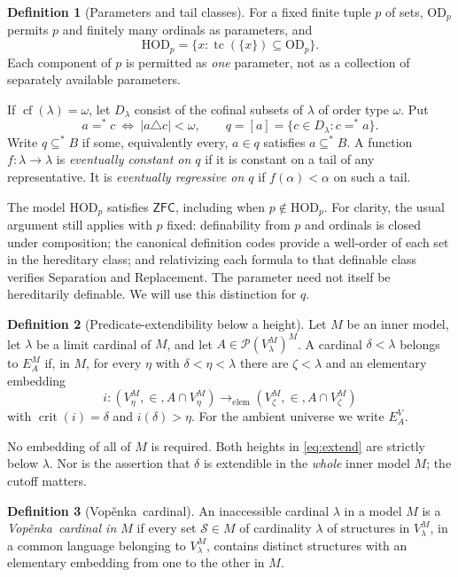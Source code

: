 \documentclass[11pt,letterpaper]{article}
\theoremstyle{definition}
\newtheorem{definition}{Definition}[section]
\numberwithin{equation}{section}
\newcommand{\ZFC}{\mathsf{ZFC}}
\newcommand{\HOD}{\mathrm{HOD}}
\newcommand{\OD}{\mathrm{OD}}
\newcommand{\crit}{\operatorname{crit}}
\newcommand{\cf}{\operatorname{cf}}
\newcommand{\Pow}{\mathcal P}
\newcommand{\tc}{\operatorname{tc}}
\newcommand{\Vop}{Vop\v{e}nka}
\newcommand{\prelem}{\longrightarrow_{\mathrm{elem}}}
\newcommand{\substar}{\subseteq^{*}}
\begin{document}
\begin{definition}[Parameters and tail classes]\label{def:tail}
For a fixed finite tuple $p$ of sets, $\OD_p$ permits $p$ and finitely many ordinals as parameters, and
\[
 \HOD_p=\{x:\tc(\{x\})\subseteq\OD_p\}.
\]
Each component of $p$ is permitted as \emph{one} parameter, not as a collection of separately available parameters.

If $\cf(\lambda)=\omega$, let $D_\lambda$ consist of the cofinal subsets of $\lambda$ of order type $\omega$. Put
\[
 a=^*c\ \Longleftrightarrow\ |a\triangle c|<\omega,
 \qquad q=[a]=\{c\in D_\lambda:c=^*a\}.
\]
Write $q\substar B$ if some, equivalently every, $a\in q$ satisfies $a\substar B$.
A function $f:\lambda\to\lambda$ is \emph{eventually constant on $q$} if it is constant on a tail of any representative. It is \emph{eventually regressive on $q$} if $f(\alpha)<\alpha$ on such a tail.
\end{definition}

The model $\HOD_p$ satisfies $\ZFC$, including when $p\notin\HOD_p$. For clarity, the usual argument still applies with $p$ fixed: definability from $p$ and ordinals is closed under composition; the canonical definition codes provide a well-order of each set in the hereditary class; and relativizing each formula to that definable class verifies Separation and Replacement. The parameter need not itself be hereditarily definable. We will use this distinction for $q$.

\begin{definition}[Predicate-extendibility below a height]\label{def:extend}
Let $M$ be an inner model, let $\lambda$ be a limit cardinal of $M$, and let $A\in\Pow(V_\lambda^M)^M$. A cardinal $\delta<\lambda$ belongs to $E_A^M$ if, in $M$, for every $\eta$ with $\delta<\eta<\lambda$ there are $\zeta<\lambda$ and an elementary embedding
\begin{equation}\label{eq:extend}
 i:(V_\eta^M,\in,A\cap V_\eta^M)
       \prelem (V_\zeta^M,\in,A\cap V_\zeta^M)
\end{equation}
with $\crit(i)=\delta$ and $i(\delta)>\eta$.
For the ambient universe we write $E_A^V$.
\end{definition}

No embedding of all of $M$ is required. Both heights in \eqref{eq:extend} are strictly below $\lambda$. Nor is the assertion that $\delta$ is extendible in the \emph{whole} inner model $M$; the cutoff matters.

\begin{definition}[\Vop\ cardinal]\label{def:vop}
An inaccessible cardinal $\lambda$ in a model $M$ is a \emph{\Vop\ cardinal in $M$} if every set $\mathcal S\in M$ of cardinality $\lambda$ of structures in $V_\lambda^M$, in a common language belonging to $V_\lambda^M$, contains distinct structures with an elementary embedding from one to the other in $M$.
\end{definition}
\end{document}
